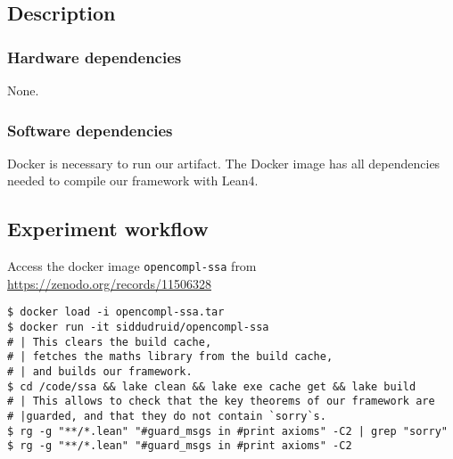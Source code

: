 \documentclass{sigplanconf}
\begin{document}
\subsection{Description}

\subsubsection{Hardware dependencies}

None.

\subsubsection{Software dependencies}

Docker is necessary to run our artifact.
The Docker image has all dependencies needed to compile our framework with Lean4.



\subsection{Experiment workflow}

Access the docker image \texttt{opencompl-ssa} from
\url{https://zenodo.org/records/11506328}

\begin{verbatim}
$ docker load -i opencompl-ssa.tar
$ docker run -it siddudruid/opencompl-ssa
# | This clears the build cache,
# | fetches the maths library from the build cache,
# | and builds our framework.
$ cd /code/ssa && lake clean && lake exe cache get && lake build
# | This allows to check that the key theorems of our framework are
# |guarded, and that they do not contain `sorry`s.
$ rg -g "**/*.lean" "#guard_msgs in #print axioms" -C2 | grep "sorry"
$ rg -g "**/*.lean" "#guard_msgs in #print axioms" -C2
\end{verbatim}

\end{document}
